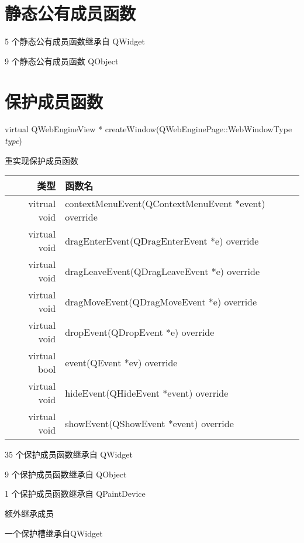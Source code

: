 \section{静态公有成员函数}

\begin{compactitem}
\item 5 个静态公有成员函数继承自 QWidget
\item 9 个静态公有成员函数 QObject
\end{compactitem}

\section{保护成员函数}


virtual QWebEngineView * createWindow(QWebEnginePage::WebWindowType \emph{type})

重实现保护成员函数

\begin{tabular}{|r|l|}
	\hline
	类型&  函数名\\
	\hline
vitrual void&	contextMenuEvent(QContextMenuEvent *event) override\\
	\hline
virtual void&	dragEnterEvent(QDragEnterEvent *e) override\\
	\hline
virtual void&	dragLeaveEvent(QDragLeaveEvent *e) override\\
	\hline
virtual void&	dragMoveEvent(QDragMoveEvent *e) override\\
	\hline
virtual void&	dropEvent(QDropEvent *e) override\\
	\hline
virtual bool&	event(QEvent *ev) override\\
	\hline
virtual void&	hideEvent(QHideEvent *event) override\\
	\hline
virtual void&	showEvent(QShowEvent *event) override \\
	\hline
\end{tabular}

\begin{compactitem}
\item 35 个保护成员函数继承自 QWidget	
\item 9 个保护成员函数继承自 QObject	
\item 1 个保护成员函数继承自 QPaintDevice
\end{compactitem}

额外继承成员

\begin{compactitem}
	\item 一个保护槽继承自QWidget
\end{compactitem}


